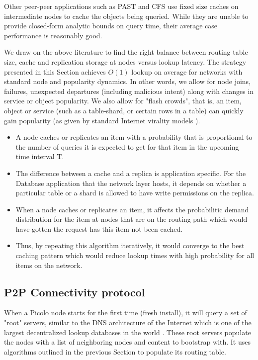 Other peer-peer applications such as PAST \cite{past} and CFS \cite{cfs} use fixed size caches on intermediate nodes to
cache the objects being queried. While they are unable to provide closed-form analytic bounds on query time, their
average case performance is reasonably good.

We draw on the above literature to find the right balance between routing table size, cache and replication storage at
nodes versus lookup latency. The strategy presented in this Section achieves \(O(1)\) lookup on average for networks with standard node
and popularity dynamics. In other words, we allow for node joins, failures, unexpected departures (including malicious
intent) along with changes in service or object popularity. We also allow for "flash crowds", that is, an item, object
or service (such as a table-shard, or certain rows in a table) can quickly gain popularity (as given by standard
Internet virality models \cite{virality_model}).

\begin{itemize}
    \item A node caches or replicates an item with a probability that is proportional to the number of queries it is
        expected to get for that item in the upcoming time interval T.
    \item The difference between a cache and a replica is application specific. For the Database application that the
        network layer hosts, it depends on whether a particular table or a shard is allowed to have write permissions on
        the replica.
    \item When a node caches or replicates an item, it affects the probabilitic demand distribution for the item at
        nodes that are on the routing path which would have gotten the request has this item not been cached.
    \item Thus, by repeating this algorithm iteratively, it would converge to the best caching pattern which would reduce
        lookup times with high probability for all items on the network.
\end{itemize}

\subsection{P2P Connectivity protocol}
\label{net:net_proto}

When a Picolo node starts for the first time (fresh install), it will query a set of "root" servers, similar to the DNS
architecture of the Internet which is one of the largest decentralized lookup databases in the world \cite{icann_root}. 
These root servers populate the nodes with a list of neighboring nodes and content to bootstrap with. It uses algorithms
outlined in the previous Section to populate its routing table.

